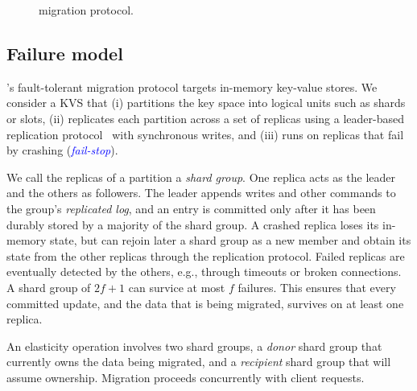 \begin{figure}[t]
  \centering
  
  \caption{\OurImplementation{} migration protocol.}%
  \label{fig:migration_flow}
\end{figure}

\subsection{Failure model}
\label{sec:applicability}
\label{sec:fault-model}

\OurImplementation{}'s fault-tolerant migration protocol targets in-memory key-value stores.
We consider a KVS that (i) partitions the key space into logical units such as shards or slots, (ii) replicates each partition across a set of replicas using a leader-based replication protocol~\cite{raft,paxos-simple,chain-replication} with synchronous writes, and (iii) runs on replicas that fail by crashing (\textcolor{blue}{\emph{fail-stop}}).

We call the replicas of a partition a \emph{shard group}. One replica acts as the leader and the others as followers. The leader appends writes and other commands to the group's \emph{replicated log}, and an entry is committed only after it has been durably stored by a majority of the shard group.
A crashed replica loses its in-memory state, but can rejoin later a shard group as a new member and obtain its state from the other replicas through the replication protocol.
Failed replicas are eventually detected by the others, e.g., through timeouts or broken connections.
A shard group of $2f+1$ can survice at most $f$ failures. This ensures that every committed update, and the data that is being migrated, survives on at least one replica.

An elasticity operation involves two shard groups, a \emph{donor} shard group that currently owns the data being migrated, and a \emph{recipient} shard group that will assume ownership.
Migration proceeds concurrently with client requests.


